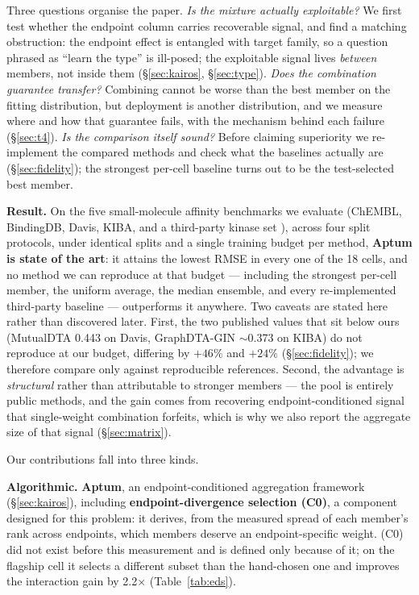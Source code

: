 \documentclass[10pt,letterpaper]{article}
\newcommand{\best}[1]{\ifmmode\mathbf{#1}\else\textbf{#1}\fi}
\begin{document}
Three questions organise the paper. \emph{Is the mixture actually exploitable?} We
first test whether the endpoint column carries recoverable signal, and find a
matching obstruction: the endpoint effect is entangled with target family, so a
question phrased as ``learn the type'' is ill-posed; the exploitable signal lives
\emph{between} members, not inside them (\S\ref{sec:kairos}, \S\ref{sec:type}).
\emph{Does the combination guarantee transfer?} Combining cannot be worse than the
best member on the fitting distribution, but deployment is another distribution, and
we measure where and how that guarantee fails, with the mechanism behind each failure
(\S\ref{sec:t4}). \emph{Is the comparison itself sound?} Before claiming superiority
we re-implement the compared methods and check what the baselines actually are
(\S\ref{sec:fidelity}); the strongest per-cell baseline turns out to be the
test-selected best member.

\textbf{Result.} On the five small-molecule affinity benchmarks we evaluate (ChEMBL,
BindingDB, Davis, KIBA, and a third-party kinase set \citep{davis2011,tang2014}),
across four split protocols, under identical splits and a single training budget per
method, \best{Aptum is state of the art}: it attains the lowest RMSE in every one of
the 18 cells, and no method we can reproduce at that budget --- including the strongest
per-cell member, the uniform average, the median ensemble, and every re-implemented
third-party baseline --- outperforms it anywhere. Two caveats are stated here rather
than discovered later. First, the two published values that sit below ours (MutualDTA
0.443 on Davis, GraphDTA-GIN $\sim$0.373 on KIBA) do not reproduce at our budget,
differing by $+46\%$ and $+24\%$ (\S\ref{sec:fidelity}); we therefore compare only
against reproducible references. Second, the advantage is \emph{structural} rather
than attributable to stronger members --- the pool is entirely public methods, and the
gain comes from recovering endpoint-conditioned signal that single-weight combination
forfeits, which is why we also report the aggregate size of that signal
(\S\ref{sec:matrix}).

Our contributions fall into three kinds.

\smallskip
\noindent\textbf{Algorithmic.} \textbf{Aptum}, an endpoint-conditioned aggregation
framework (\S\ref{sec:kairos}), including \textbf{endpoint-divergence selection (C0)},
a component designed for this problem: it derives, from the measured spread of each
member's rank across endpoints, which members deserve an endpoint-specific weight.
(C0) did not exist before this measurement and is defined only because of it; on the
flagship cell it selects a different subset than the hand-chosen one and improves the
interaction gain by 2.2$\times$ (Table~\ref{tab:eds}).
\end{document}
